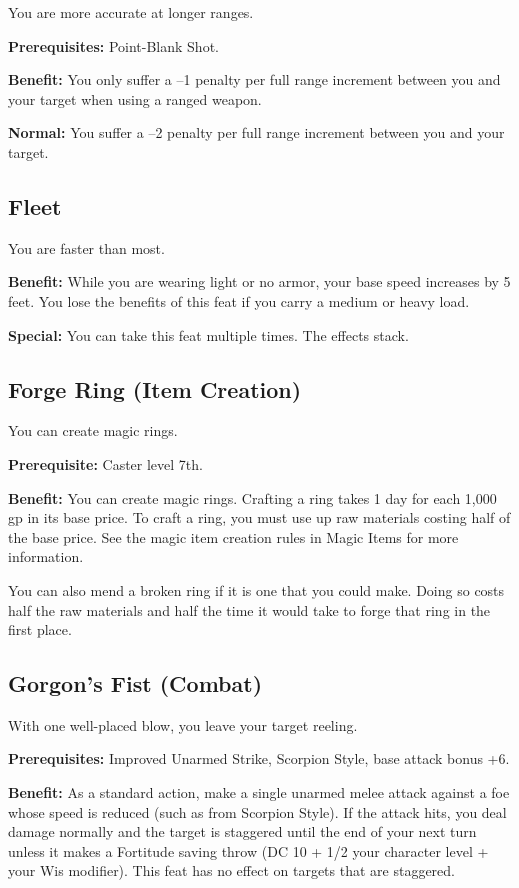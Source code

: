 				
You are more accurate at longer ranges.
				
\textbf{Prerequisites:} Point-Blank Shot.
				
\textbf{Benefit:} You only suffer a --1 penalty per full range increment between you and your target when using a ranged weapon.
				
\textbf{Normal:} You suffer a --2 penalty per full range increment between you and your target.
				
\subsection{Fleet}

				
You are faster than most.
				
\textbf{Benefit:} While you are wearing light or no armor, your base speed increases by 5 feet. You lose the benefits of this feat if you carry a medium or heavy load.
				
\textbf{Special:} You can take this feat multiple times. The effects stack. 
				
\subsection{Forge Ring (Item Creation)}

				
You can create magic rings.
				
\textbf{Prerequisite:} Caster level 7th.
				
\textbf{Benefit:} You can create magic rings. Crafting a ring takes 1 day for each 1,000 gp in its base price. To craft a ring, you must use up raw materials costing half of the base price. See the magic item creation rules in Magic Items for more information.

You can also mend a broken ring if it is one that you could make. Doing so costs half the raw materials and half the time it would take to forge that ring in the first place.
				
\subsection{Gorgon's Fist (Combat)}

				
With one well-placed blow, you leave your target reeling.
				
\textbf{Prerequisites:} Improved Unarmed Strike, Scorpion Style, base attack bonus +6.
				
\textbf{Benefit:} As a standard action, make a single unarmed melee attack against a foe whose speed is reduced (such as from Scorpion Style). If the attack hits, you deal damage normally and the target is staggered until the end of your next turn unless it makes a Fortitude saving throw (DC 10 + 1/2 your character level + your Wis modifier). This feat has no effect on targets that are staggered.
				
